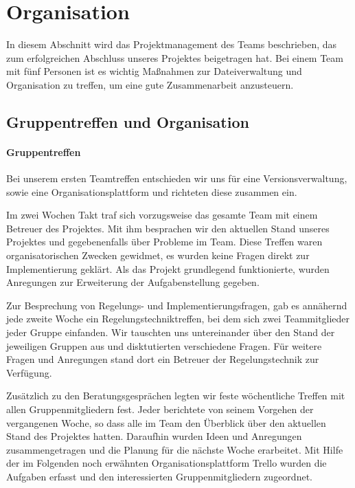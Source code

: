 \section{Organisation}
\label{cha:Organisation}
In diesem Abschnitt wird das Projektmanagement des Teams beschrieben, das zum erfolgreichen Abschluss unseres Projektes beigetragen hat. Bei einem Team mit fünf Personen ist es wichtig Maßnahmen zur Dateiverwaltung und Organisation zu treffen, um eine gute Zusammenarbeit anzusteuern.

\subsection{Gruppentreffen und Organisation}
\label{sec:gruppentreffenundorganisation}
\paragraph{Gruppentreffen}
Bei unserem ersten Teamtreffen entschieden wir uns für eine Versionsverwaltung, sowie eine Organisationsplattform und richteten diese zusammen ein.

Im zwei Wochen Takt traf sich vorzugsweise das gesamte Team mit einem Betreuer des Projektes. Mit ihm besprachen wir den aktuellen Stand unseres Projektes und gegebenenfalls über Probleme im Team. Diese Treffen waren organisatorischen Zwecken gewidmet, es wurden keine Fragen direkt zur Implementierung geklärt. Als das Projekt grundlegend funktionierte, wurden Anregungen zur Erweiterung der Aufgabenstellung gegeben. 

Zur Besprechung von Regelungs- und Implementierungsfragen, gab es annähernd jede zweite Woche ein Regelungstechniktreffen, bei dem sich zwei Teammitglieder jeder Gruppe einfanden. Wir tauschten uns untereinander über den Stand der jeweiligen Gruppen aus und disktutierten verschiedene Fragen. Für weitere Fragen und Anregungen stand dort ein Betreuer der Regelungstechnik zur Verfügung.

Zusätzlich zu den Beratungsgesprächen legten wir feste wöchentliche Treffen mit allen Gruppenmitgliedern fest. Jeder berichtete von seinem Vorgehen der vergangenen Woche, so dass alle im Team den Überblick über den aktuellen Stand des Projektes hatten. Daraufhin wurden Ideen und Anregungen zusammengetragen und die Planung für die nächste Woche erarbeitet. Mit Hilfe der im Folgenden noch erwähnten Organisationsplattform Trello wurden die Aufgaben erfasst und den interessierten Gruppenmitgliedern zugeordnet. 

